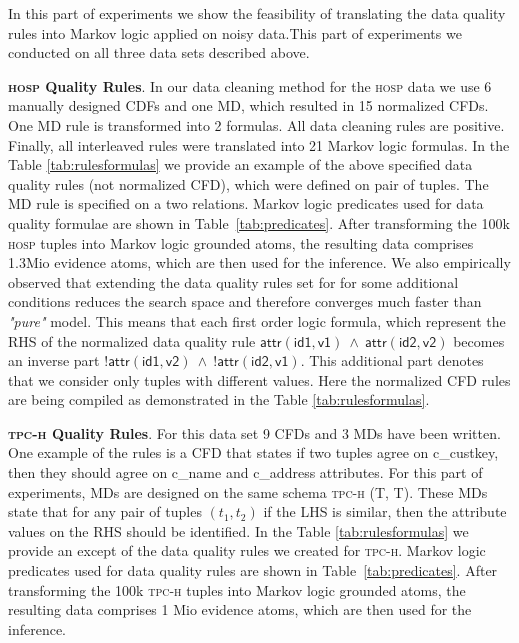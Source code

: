 In this part of experiments we show the feasibility of translating the data quality rules into Markov logic applied on noisy data.This part of experiments we conducted on all three data sets described above. 

\textbf{\textsc{hosp} Quality Rules}. In our data cleaning method for the \textsc{hosp} data we use 6 manually designed CDFs and one MD, which resulted in 15 normalized CFDs. One MD rule is transformed into 2 formulas. All data cleaning rules are positive. Finally, all interleaved rules were translated into 21 Markov logic formulas. In the Table \ref{tab:rulesformulas} we provide an example of the above specified data quality rules (not normalized CFD), which were defined on pair of tuples. The MD rule is specified on a two relations. Markov logic predicates used for data quality formulae are shown in Table~\ref{tab:predicates}. After transforming the 100k \textsc{hosp} tuples into Markov logic grounded atoms, the resulting data comprises 1.3Mio evidence atoms, which are then used for the inference. We also empirically observed that extending the data quality rules set for for some additional conditions reduces the search space and therefore converges much faster than \textit{"pure"} model. This means that each first order logic formula, which represent the RHS of the normalized data quality rule $\mathsf{\textsf{attr}(id1, v1)~\wedge~\textsf{attr}(id2, v2)}$ becomes an inverse part $\mathsf{!\textsf{attr}(id1, v2)~\wedge~!\textsf{attr}(id2, v1)}$. This additional part denotes that we consider only tuples with different values. Here the normalized CFD rules are being compiled as demonstrated in the Table \ref{tab:rulesformulas}. 

\textbf{\textsc{tpc-h} Quality Rules}. For this data set 9 CFDs and 3 MDs have been written. One example of the rules is a CFD that states if two tuples agree on \textsf{c\_custkey}, then they should agree on \textsf{c\_name} and \textsf{c\_address} attributes. For this part of experiments, MDs are designed on the same schema \textsc{tpc-h} \textsf{(T, T)}. These MDs state that for any pair of tuples $(t_1,t_2)$ if the LHS is similar, then the attribute values on the RHS should be identified. In the Table \ref{tab:rulesformulas} we provide an except of the data quality rules we created for \textsc{tpc-h}.
Markov logic predicates used for data quality rules are shown in Table~\ref{tab:predicates}. After transforming the 100k \textsc{tpc-h} tuples into Markov logic grounded atoms, the resulting data comprises 1 Mio evidence atoms, which are then used for the inference.

